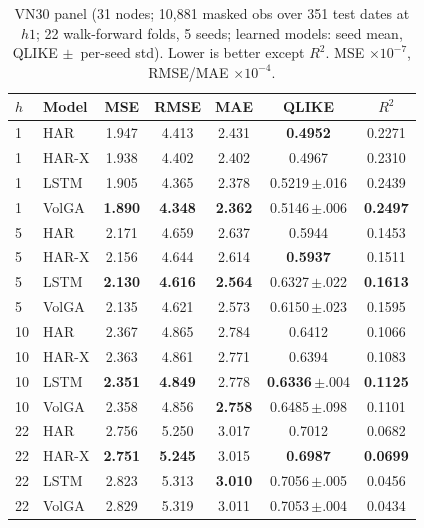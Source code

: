 \documentclass[runningheads]{llncs}
\begin{document}
\begin{table}[t]
\centering
\caption{VN30 panel (31 nodes; 10{,}881 masked obs over 351 test dates at $h1$; 22 walk-forward folds,
5 seeds; learned models: seed mean, QLIKE $\pm$~per-seed std). Lower is better except $R^2$.
MSE $\times10^{-7}$, RMSE/MAE $\times10^{-4}$.}
\label{tab:vn30}
\footnotesize
\setlength{\tabcolsep}{5pt}
\begin{tabular}{llccccc}
\toprule
$h$ & Model & MSE & RMSE & MAE & QLIKE & $R^2$ \\
\midrule
1 & HAR   & 1.947 & 4.413 & 2.431 & \textbf{0.4952} & 0.2271 \\
1 & HAR-X & 1.938 & 4.402 & 2.402 & 0.4967 & 0.2310 \\
1 & LSTM  & 1.905 & 4.365 & 2.378 & 0.5219\,$\pm$.016 & 0.2439 \\
1 & VolGA & \textbf{1.890} & \textbf{4.348} & \textbf{2.362} & 0.5146\,$\pm$.006 & \textbf{0.2497} \\
\midrule
5 & HAR   & 2.171 & 4.659 & 2.637 & 0.5944 & 0.1453 \\
5 & HAR-X & 2.156 & 4.644 & 2.614 & \textbf{0.5937} & 0.1511 \\
5 & LSTM  & \textbf{2.130} & \textbf{4.616} & \textbf{2.564} & 0.6327\,$\pm$.022 & \textbf{0.1613} \\
5 & VolGA & 2.135 & 4.621 & 2.573 & 0.6150\,$\pm$.023 & 0.1595 \\
\midrule
10 & HAR   & 2.367 & 4.865 & 2.784 & 0.6412 & 0.1066 \\
10 & HAR-X & 2.363 & 4.861 & 2.771 & 0.6394 & 0.1083 \\
10 & LSTM  & \textbf{2.351} & \textbf{4.849} & 2.778 & \textbf{0.6336}\,$\pm$.004 & \textbf{0.1125} \\
10 & VolGA & 2.358 & 4.856 & \textbf{2.758} & 0.6485\,$\pm$.098 & 0.1101 \\
\midrule
22 & HAR   & 2.756 & 5.250 & 3.017 & 0.7012 & 0.0682 \\
22 & HAR-X & \textbf{2.751} & \textbf{5.245} & 3.015 & \textbf{0.6987} & \textbf{0.0699} \\
22 & LSTM  & 2.823 & 5.313 & \textbf{3.010} & 0.7056\,$\pm$.005 & 0.0456 \\
22 & VolGA & 2.829 & 5.319 & 3.011 & 0.7053\,$\pm$.004 & 0.0434 \\
\bottomrule
\end{tabular}
\end{table}
\end{document}

